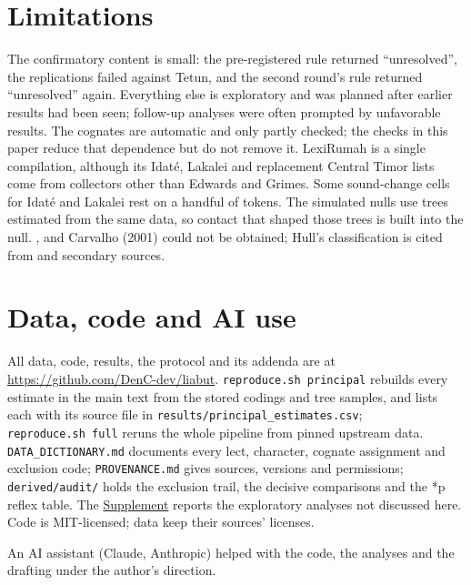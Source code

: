 \documentclass[11pt]{article}
\begin{document}
\section{Limitations}

The confirmatory content is small: the pre-registered rule returned ``unresolved'', the replications failed against Tetun, and the second round's rule returned ``unresolved'' again. Everything else is exploratory and was planned after earlier results had been seen; follow-up analyses were often prompted by unfavorable results. The cognates are automatic and only partly checked; the checks in this paper reduce that dependence but do not remove it. LexiRumah is a single compilation, although its Idaté, Lakalei and replacement Central Timor lists come from collectors other than Edwards and Grimes. Some sound-change cells for Idaté and Lakalei rest on a handful of tokens. The simulated nulls use trees estimated from the same data, so contact that shaped those trees is built into the null. \citet{hull1998}, \citet{hull2001b} and Carvalho (2001) could not be obtained; Hull's classification is cited from \citet{hull2001a,hull2003} and secondary sources.

\section*{Data, code and AI use}

All data, code, results, the protocol and its addenda are at \url{https://github.com/DenC-dev/liabut}. \texttt{reproduce.sh\ principal} rebuilds every estimate in the main text from the stored codings and tree samples, and lists each with its source file in \texttt{results/principal\_estimates.csv}; \texttt{reproduce.sh\ full} reruns the whole pipeline from pinned upstream data. \texttt{DATA\_DICTIONARY.md} documents every lect, character, cognate assignment and exclusion code; \texttt{PROVENANCE.md} gives sources, versions and permissions; \texttt{derived/audit/} holds the exclusion trail, the decisive comparisons and the *p reflex table. The \hyperref[supplement]{Supplement} reports the exploratory analyses not discussed here. Code is MIT-licensed; data keep their sources' licenses.

An AI assistant (Claude, Anthropic) helped with the code, the analyses and the drafting under the author's direction.
\end{document}

